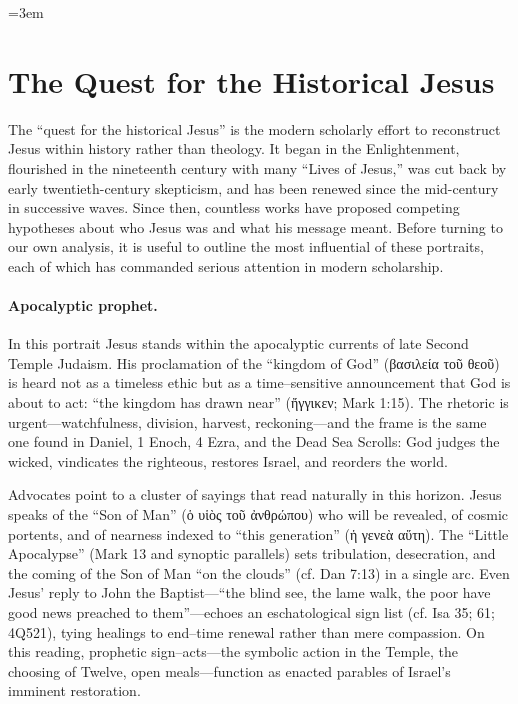 \hfuzz=5pt %
\emergencystretch=3em %

\section{The Quest for the Historical Jesus}\label{sec:quest}

The “quest for the historical Jesus” is the modern scholarly effort to reconstruct Jesus within history rather than theology.
It began in the Enlightenment, flourished in the nineteenth century with many “Lives of Jesus,” was cut back by early twentieth-century skepticism, and has been renewed since the mid-century in successive waves.
Since then, countless works have proposed competing hypotheses about who Jesus was and what his message meant.
Before turning to our own analysis, it is useful to outline the most influential of these portraits, each of which has commanded serious attention in modern scholarship.

\paragraph{Apocalyptic prophet.}

In this portrait Jesus stands within the apocalyptic currents of late Second Temple Judaism.
His proclamation of the “kingdom of God” (βασιλεία τοῦ θεοῦ) is heard not as a timeless ethic but as a time–sensitive announcement that God is about to act: “the kingdom has drawn near” (ἤγγικεν; Mark 1:15).
The rhetoric is urgent—watchfulness, division, harvest, reckoning—and the frame is the same one found in Daniel, 1 Enoch, 4 Ezra, and the Dead Sea Scrolls: God judges the wicked, vindicates the righteous, restores Israel, and reorders the world.

Advocates point to a cluster of sayings that read naturally in this horizon.
Jesus speaks of the “Son of Man” (ὁ υἱὸς τοῦ ἀνθρώπου) who will be revealed, of cosmic portents, and of nearness indexed to “this generation” (ἡ γενεὰ αὕτη).
The “Little Apocalypse” (Mark 13 and synoptic parallels) sets tribulation, desecration, and the coming of the Son of Man “on the clouds” (cf. Dan 7:13) in a single arc.
Even Jesus’ reply to John the Baptist—“the blind see, the lame walk, the poor have good news preached to them”—echoes an eschatological sign list (cf. Isa 35; 61; 4Q521), tying healings to end–time renewal rather than mere compassion.
On this reading, prophetic sign–acts—the symbolic action in the Temple, the choosing of Twelve, open meals—function as enacted parables of Israel’s imminent restoration.

